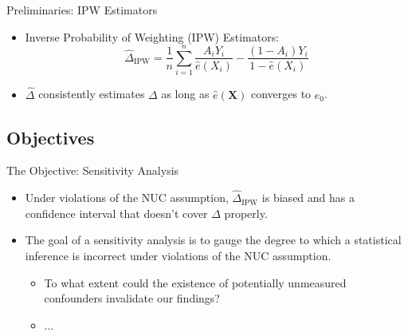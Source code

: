 \documentclass{beamer}
\begin{document}

\begin{frame}{Preliminaries: IPW Estimators}

\begin{itemize}
  \itemsep12pt
  \item Inverse Probability of Weighting (IPW) Estimators:
    \[
      \hat{\Delta}_{\text{IPW}} = \frac{1}{n} \sum_{i = 1}^n
      \frac{A_iY_i}{\hat{e}(X_i)} - \frac{(1 - A_i)Y_i}{1 - \hat{e}(X_i)}
    \]
  \item $\hat{\Delta}$ consistently estimates $\Delta$ as long as
    $\hat{e}(\bm{X})$ converges to $e_0$.
\end{itemize}

\end{frame}

\subsection{Objectives}

\begin{frame}{The Objective: Sensitivity Analysis}

\begin{itemize}
  \itemsep12pt
  \item Under violations of the NUC assumption, $\hat{\Delta}_{\text{IPW}}$ is
    biased and has a confidence interval that doesn't cover $\Delta$ properly.
  \item The goal of a sensitivity analysis is to gauge the degree to which a
    statistical inference is incorrect under violations of the NUC assumption.
    \begin{itemize}
      \item To what extent could the existence of potentially unmeasured
        confounders invalidate our findings?
      \item ...
    \end{itemize}
\end{itemize}

\end{frame}

\end{document}
